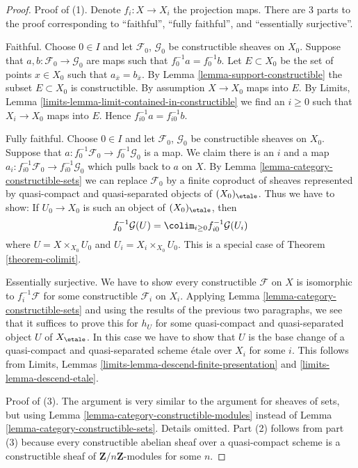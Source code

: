 \begin{proof}
Proof of (1). Denote $f_i : X \to X_i$ the projection maps.
There are 3 parts to the proof corresponding to ``faithful'',
``fully faithful'', and ``essentially surjective''.

\medskip\noindent
Faithful. Choose $0 \in I$ and let $\mathcal{F}_0$, $\mathcal{G}_0$ be
constructible sheaves on $X_0$. Suppose that
$a, b : \mathcal{F}_0 \to \mathcal{G}_0$ are maps such that
$f_0^{-1}a = f_0^{-1}b$. Let $E \subset X_0$ be the set
of points $x \in X_0$ such that $a_{\overline{x}} = b_{\overline{x}}$.
By Lemma \ref{lemma-support-constructible} the subset
$E \subset X_0$ is constructible. By assumption $X \to X_0$ maps into $E$.
By Limits, Lemma \ref{limits-lemma-limit-contained-in-constructible}
we find an $i \geq 0$ such that $X_i \to X_0$ maps into $E$.
Hence $f_{i0}^{-1}a = f_{i0}^{-1}b$.

\medskip\noindent
Fully faithful. Choose $0 \in I$ and let $\mathcal{F}_0$, $\mathcal{G}_0$ be
constructible sheaves on $X_0$. Suppose that
$a : f_0^{-1}\mathcal{F}_0 \to f_0^{-1}\mathcal{G}_0$ is a map.
We claim there is an $i$ and a map
$a_i : f_{i0}^{-1}\mathcal{F}_0 \to f_{i0}^{-1}\mathcal{G}_0$
which pulls back to $a$ on $X$.
By Lemma \ref{lemma-category-constructible-sets}
we can replace $\mathcal{F}_0$
by a finite coproduct of sheaves represented by quasi-compact
and quasi-separated objects of $(X_0)_\etale$.
Thus we have to show: If $U_0 \to X_0$ is such an object
of $(X_0)_\etale$, then
$$
f_0^{-1}\mathcal{G}(U) = \colim_{i \geq 0} f_{i0}^{-1}\mathcal{G}(U_i)
$$
where $U = X \times_{X_0} U_0$ and $U_i = X_i \times_{X_0} U_0$.
This is a special case of Theorem \ref{theorem-colimit}.

\medskip\noindent
Essentially surjective. We have to show every constructible $\mathcal{F}$
on $X$ is isomorphic to $f_i^{-1}\mathcal{F}$ for some constructible
$\mathcal{F}_i$ on $X_i$. Applying
Lemma \ref{lemma-category-constructible-sets}
and using the results of the previous two paragraphs, we see that
it suffices to prove this for $h_U$ for some quasi-compact
and quasi-separated object $U$ of $X_\etale$.
In this case we have to show that $U$ is the base change of
a quasi-compact and quasi-separated scheme \'etale over $X_i$ for some $i$.
This follows from
Limits, Lemmas \ref{limits-lemma-descend-finite-presentation} and
\ref{limits-lemma-descend-etale}.

\medskip\noindent
Proof of (3). The argument is very similar to the argument for
sheaves of sets, but using
Lemma \ref{lemma-category-constructible-modules}
instead of
Lemma \ref{lemma-category-constructible-sets}. Details omitted.
Part (2) follows from part (3) because every constructible abelian
sheaf over a quasi-compact scheme is a constructible sheaf of
$\mathbf{Z}/n\mathbf{Z}$-modules for some $n$.
\end{proof}

